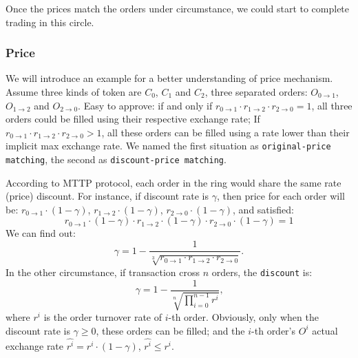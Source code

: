 \documentclass[UTF8,nofonts]{article}
\begin{document}
Once the prices match the orders under circumstance,  we could start to complete trading in this circle.

\subsubsection{Price\label{sec: matchprice}}
We will introduce an example for a better understanding of price mechanism. Assume three kinds of token are $C_{0}$, $C_{1}$ and $C_{2}$, three separated orders: $O_{0\rightarrow 1}$, $O_{1 \rightarrow 2}$ and $O_{2 \rightarrow 0}$. Easy to approve: if and only if $r_{0 \rightarrow 1} \cdot r_{1 \rightarrow 2}\cdot r_{2 \rightarrow 0} = 1$,  all three orders could be filled using their respective exchange rate; If $r_{0 \rightarrow 1} \cdot r_{1 \rightarrow 2}\cdot r_{2 \rightarrow 0} > 1$, all these orders can be filled using a rate lower than their implicit max exchange rate. We named the first situation as \texttt{original-price matching}, the second as \texttt{discount-price matching}.

According to MTTP protocol, each order in the ring would share the same rate (price) discount. For instance, if discount rate is $\gamma$, then price for each order will be:
$r_{0\rightarrow 1} \cdot (1-\gamma)$, $r_{1\rightarrow 2} \cdot (1-\gamma)$, $r_{2 \rightarrow 0} \cdot (1-\gamma)$, and satisfied: 
\begin{equation}
r_{0\rightarrow 1} \cdot (1-\gamma)\cdot r_{1\rightarrow 2} \cdot (1-\gamma) \cdot r_{2 \rightarrow 0} \cdot (1-\gamma) = 1
\end{equation}
We can find out: 
\begin{equation*}
\gamma = 1- \frac{1}{\sqrt[3]{r_{0\rightarrow 1} \cdot r_{1\rightarrow 2} \cdot r_{2\rightarrow 0}}}\text{.}
\end{equation*}
In the other circumstance, if transaction cross $n$ orders, the \texttt{discount} is: 
\begin{equation*}
\gamma = 1- \frac{1}{\sqrt[n]{\prod_{i=0}^{n-1} r^i}} \text{,}
\end{equation*}
where $r^i$ is the order turnover rate of $i$-th order. Obviously, only when the discount rate is $\gamma \ge 0$, these orders can be filled; and the $i$-th order's $O^i$ actual exchange rate $\hat{r^i} = r^i \cdot (1-\gamma)$, $\hat{r^i}\le r^i$.

\end{document}
